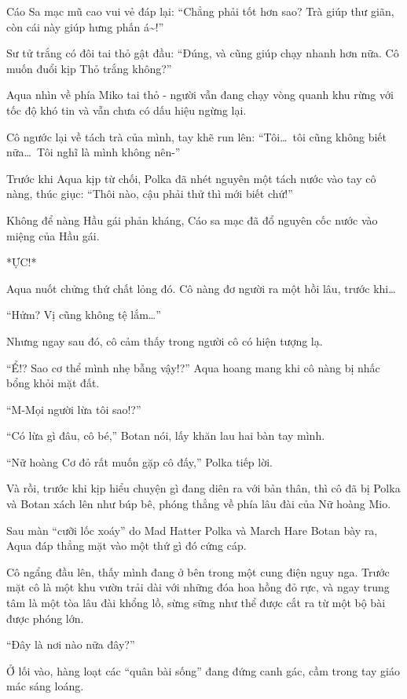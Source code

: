 \documentclass[../main.tex]{subfiles}
\begin{document}
Cáo Sa mạc mũ cao vui vẻ đáp lại: ``Chẳng phải tốt hơn sao? Trà giúp thư giãn, còn cái này giúp hưng phấn á\~{}!''

Sư tử trắng có đôi tai thỏ gật đầu: ``Đúng, và cũng giúp chạy nhanh hơn nữa. Cô muốn đuổi kịp Thỏ trắng không?''

Aqua nhìn về phía Miko tai thỏ - người vẫn đang chạy vòng quanh khu rừng với tốc độ khó tin và vẫn chưa có dấu hiệu ngừng lại.

Cô ngước lại về tách trà của mình, tay khẽ run lên: ``Tôi\dots\ tôi cũng không biết nữa\dots\ Tôi nghĩ là mình không nên-''

Trước khi Aqua kịp từ chối, Polka đã nhét nguyên một tách nước vào tay cô nàng, thúc giục: ``Thôi nào, cậu phải thử thì mới biết chứ!''

Không để nàng Hầu gái phản kháng, Cáo sa mạc đã đổ nguyên cốc nước vào miệng của Hầu gái.

*ỰC!*

Aqua nuốt chửng thứ chất lỏng đó. Cô nàng đơ người ra một hồi lâu, trước khi\dots

``Hửm? Vị cũng không tệ lắm\dots''

Nhưng ngay sau đó, cô cảm thấy trong người cô có hiện tượng lạ.

``Ể!? Sao cơ thể mình nhẹ bẫng vậy!?'' Aqua hoang mang khi cô nàng bị nhấc bổng khỏi mặt đất.

``M-Mọi người lừa tôi sao!?''

``Có lừa gì đâu, cô bé,'' Botan nói, lấy khăn lau hai bàn tay mình.

``Nữ hoàng Cơ đỏ rất muốn gặp cô đấy,'' Polka tiếp lời.

Và rồi, trước khi kịp hiểu chuyện gì đang diên ra với bản thân, thì cô đã bị Polka và Botan xách lên như búp bê, phóng thẳng về phía lâu đài của Nữ hoàng Mio.

\ct

Sau màn ``cưỡi lốc xoáy'' do Mad Hatter Polka và March Hare Botan bày ra, Aqua đáp thẳng mặt vào một thứ gì đó cứng cáp.

Cô ngẩng đầu lên, thấy mình đang ở bên trong một cung điện nguy nga. Trước mặt cô là một khu vườn trải dài với những đóa hoa hồng đỏ rực, và ngay trung tâm là một tòa lâu đài khổng lồ, sừng sững như thể được cắt ra từ một bộ bài được phóng lớn.

``Đây là nơi nào nữa đây?''

Ở lối vào, hàng loạt các ``quân bài sống'' đang đứng canh gác, cầm trong tay giáo mác sáng loáng.
\end{document}
